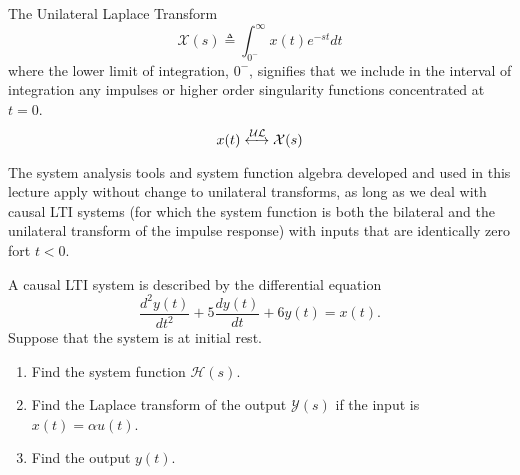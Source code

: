 \begin{frame}{The Unilateral Laplace Transform}
    \begin{equation*}
        \mathcal{X}(s) \triangleq \int_{0^{-}}^{\infty}x(t)e^{-st}dt
    \end{equation*}
    where the lower limit of integration, $0^{-}$, signifies that we include in the interval of integration any impulses or higher order singularity functions concentrated at $t = 0$.
    \begin{equation*}
        x(t) \xleftrightarrow{\mathcal{UL}} \mathcal{X}(s)
    \end{equation*}

    \pause
    {
    }

    The system analysis tools and system function algebra developed and used in this lecture apply without change to unilateral transforms, \alert{as long
as we deal with causal LTI systems (for which the system function is both the bilateral and the unilateral transform of the impulse response) with inputs that are identically zero
fort $t< 0$}.
\end{frame}



\begin{frame}
    \begin{example}
        A causal LTI system is described by the differential equation
        \begin{equation*}
            \frac{d^2y(t)}{dt^2} + 5\frac{dy(t)}{dt} + 6y(t) = x(t).
        \end{equation*}
        Suppose that the system is at initial rest.
        \begin{enumerate}
            \item Find the system function $\mathcal{H}(s)$.
            \item Find the Laplace transform of the output $\mathcal{Y}(s)$ if the input is $x(t) = \alpha u(t)$.
            \item Find the output $y(t)$.
        \end{enumerate}
    \end{example}
\end{frame}





